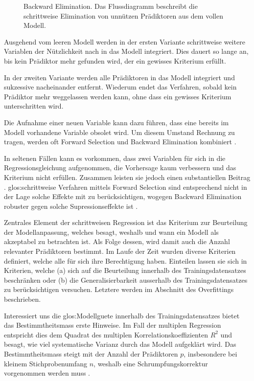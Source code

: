 \begin{figure}[htbp]
	\caption{Backward Elimination. Das Flussdiagramm beschreibt die schrittweise Elimination von unnützen Prädiktoren aus dem vollen Modell.}
	\label{fig:backward_stepwise}
\end{figure}
Ausgehend vom leeren Modell werden in der ersten Variante schrittweise weitere Variablen der Nützlichkeit nach in das Modell integriert. Dies dauert so lange an, bis kein Prädiktor mehr gefunden wird, der ein gewisses Kriterium erfüllt.

In der zweiten Variante werden alle Prädiktoren in das Modell integriert und sukzessive nacheinander entfernt. Wiederum endet das Verfahren, sobald kein Prädiktor mehr weggelassen werden kann, ohne dass ein gewisses Kriterium unterschritten wird.

Die Aufnahme einer neuen Variable kann dazu führen, dass eine bereits im Modell vorhandene Variable obsolet wird. 
Um diesem Umstand Rechnung zu tragen, werden oft Forward Selection und Backward Elimination kombiniert \cite[p. 461]{bortz2011}. 

In seltenen Fällen kann es vorkommen, dass zwei Variablen für sich in die Regressionsgleichung aufgenommen, die Vorhersage kaum verbessern und das Kriterium nicht erfüllen. Zusammen leisten sie jedoch  einen substantiellen Beitrag \cite[p.261]{jacob2003applied}. 
\Gls{glos:schrittweise Verfahren} mittels Forward Selection sind entsprechend nicht in der Lage solche Effekte mit zu berücksichtigen, wogegen Backward Elimination robuster gegen solche Supressionseffekte ist \cite{shieh2006suppression}. 

Zentrales Element der schrittweisen Regression ist das Kriterium zur Beurteilung der  Modellanpassung, welches besagt, weshalb und wann ein Modell als akzeptabel zu betrachten ist. Als Folge dessen, wird damit auch die Anzahl relevanter Prädiktoren bestimmt. Im Laufe der Zeit wurden diverse Kriterien definiert, welche alle für sich ihre Berechtigung haben.
Einteilen lassen sie sich in Kriterien, welche (a) sich auf die Beurteilung innerhalb des Trainingsdatensatzes beschränken oder (b) die Generalisierbarkeit ausserhalb des Trainingsdatensatzes zu berücksichtigen versuchen. Letztere werden im Abschnitt des Overfittings beschrieben.

Interessiert uns die \Gls{glos:Modellguete} innerhalb des Trainingsdatensatzes bietet das Bestimmtheitsmass erste Hinweise. Im Fall der multiplen Regression entspricht dies dem Quadrat des multiplen Korrelationskoeffizienten $R^2$ und  besagt, wie viel systematische Varianz durch das Modell aufgeklärt  wird. 
Das Bestimmtheitsmass steigt mit der Anzahl der Prädiktoren $p$, insbesondere bei kleinem Stichprobenumfang $n$, weshalb eine Schrumpfungskorrektur vorgenommen werden muss \cite[p. 451]{bortz2011}. 

